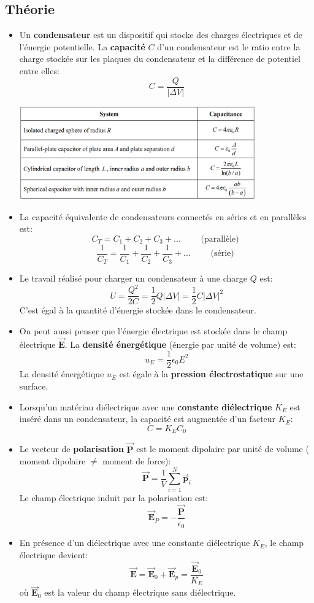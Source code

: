 \documentclass[a4paper]{article}
\begin{document}
\subsection{Théorie}







\begin{itemize}
    \item Un \textbf{condensateur} est un dispositif qui stocke des charges électriques et de l'énergie potentielle. La \textbf{capacité} $ C $ 
d'un condensateur est le ratio entre la charge stockée sur les plaques du condensateur et la différence de potentiel entre elles: 
\[ C = \frac{Q}{ | \Delta V | } \]
\begin{center}
\includegraphics[width=0.8\textwidth]{capacite1.PNG}
\end{center}
    \item La capacité équivalente de condensateurs connectés en séries et en parallèles est: 
\[ C_T = C_1 + C_2 + C_3 + ... \qquad \text{ (parallèle) } \]
\[ \frac{1}{C_T} = \frac{1}{C_1} + \frac{1}{C_2} + \frac{1}{C_3} + ... \qquad \text{ (série) } \]
    \item Le travail réalisé pour charger un condensateur à une charge $ Q $ est: 
\[ U = \frac{Q^2}{2 C} = \frac{1}{2} Q | \Delta V | = \frac{1}{2} C | \Delta V |^2 \]
C'est égal à la quantité d'énergie stockée dans le condensateur.
    \item On peut aussi penser que l'énergie électrique est stockée dans le champ électrique $ \vec{\textbf{E}} $. La \textbf{densité 
énergétique} (énergie par unité de volume) est: \[ u_E = \frac{1}{2} \epsilon_0 E^2 \]
La densité énergétique $ u_E $ est égale à la \textbf{pression électrostatique} sur une surface.
    \item Lorsqu'un matériau diélectrique avec une \textbf{constante diélectrique} $ K_E $ est inséré dans un condensateur, la capacité 
est augmentée d'un facteur $ K_E $: \[ C = K_E C_0 \]
    \item Le vecteur de \textbf{polarisation} $ \vec{\textbf{P}} $ est le moment dipolaire par unité de volume (\danger \; moment 
dipolaire $ \neq $ moment de force): \[ \vec{\textbf{P}} = \frac{1}{V} \sum_{i=1}^{N} \vec{\textbf{p}}_i \]
Le champ électrique induit par la polarisation est: \[ \vec{\textbf{E}}_P = - \frac{\vec{\textbf{P}}}{\epsilon_0} \]
    \item En présence d'un diélectrique avec une constante diélectrique $ K_E $, le champ électrique devient: 
\[ \vec{\textbf{E}} = \vec{\textbf{E}}_0 + \vec{\textbf{E}}_p = \frac{\vec{\textbf{E}}_0}{K_E} \]
où  $ \vec{\textbf{E}}_0 $ est la valeur du champ électrique sans diélectrique.
\end{itemize}
\end{document}
